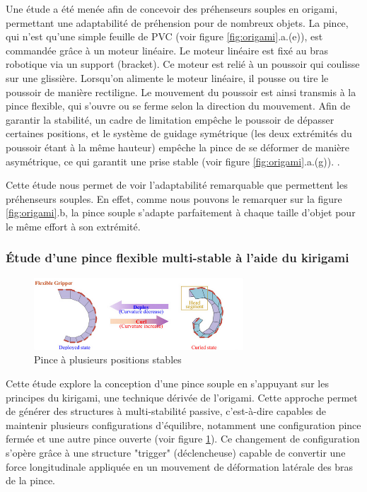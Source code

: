 \documentclass[a4paper, 11pt]{report}
\begin{document}
            Une étude a été menée afin de concevoir des préhenseurs souples en origami, permettant une adaptabilité de préhension pour de nombreux objets. La pince, qui n'est qu'une simple feuille de PVC (voir figure \ref{fig:origami}.a.(e)), est commandée grâce à un moteur linéaire. Le moteur linéaire est fixé au bras robotique via un support (bracket). Ce moteur est relié à un poussoir qui coulisse sur une glissière. Lorsqu’on alimente le moteur linéaire, il pousse ou tire le poussoir de manière rectiligne. Le mouvement du poussoir est ainsi transmis à la pince flexible, qui s’ouvre ou se ferme selon la direction du mouvement. Afin de garantir la stabilité, un cadre de limitation empêche le poussoir de dépasser certaines positions, et le système de guidage symétrique (les deux extrémités du poussoir étant à la même hauteur) empêche la pince de se déformer de manière asymétrique, ce qui garantit une prise stable (voir figure \ref{fig:origami}.a.(g)). \cite{liu_origami_2023}.
    
            Cette étude nous permet de voir l'adaptabilité remarquable que permettent les préhenseurs souples. En effet, comme nous pouvons le remarquer sur la figure \ref{fig:origami}.b, la pince souple s'adapte parfaitement à chaque taille d'objet pour le même effort à son extrémité.

        \subsubsection{Étude d'une pince flexible multi-stable à l'aide du kirigami}
    
            \begin{figure}
                \centering
                \includegraphics[width=0.7\textwidth]{Figures/multi-stable.png}
                \caption{Pince à plusieurs positions stables \cite{qi_kirigami_2024}}
                \label{fig:multi_stable}
            \end{figure}
    
            Cette étude \cite{qi_kirigami_2024} explore la conception d'une pince souple en s'appuyant sur les principes du kirigami, une technique dérivée de l'origami. Cette approche permet de générer des structures à multi-stabilité passive, c’est-à-dire capables de maintenir plusieurs configurations d’équilibre, notamment une configuration pince fermée et une autre pince ouverte (voir figure \ref{fig:multi_stable}). Ce changement de configuration s'opère grâce à une structure "trigger" (déclencheuse) capable de convertir une force longitudinale appliquée en un mouvement de déformation latérale des bras de la pince.
    
\end{document}

